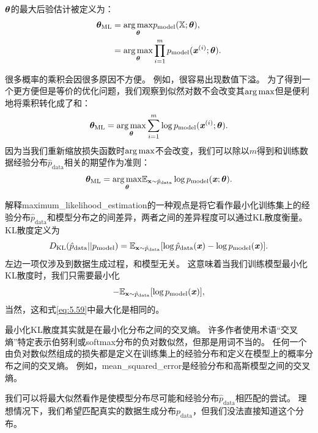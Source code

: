  $\boldsymbol{\theta}$的最大后验估计被定义为：
\begin{align}
    \boldsymbol{\theta}_{\text{ML}} &= \underset{\boldsymbol{\theta}}{\arg\max} p_{\text{model}} (\mathbb{X}; \boldsymbol{\theta}), \\
        &= \underset{\boldsymbol{\theta}}{\arg\max} \prod_{i=1}^m p_{\text{model}} (\boldsymbol{\mathit{x}}^{(i)}; \boldsymbol{\theta}).
\end{align}

很多概率的乘积会因很多原因不方便。
例如，很容易出现数值下溢。
为了得到一个更方便但是等价的优化问题，我们观察到似然对数不会改变其$\arg\max$但是便利地将乘积转化成了和：
\begin{equation}
    \boldsymbol{\theta}_{\text{ML}} = \underset{\boldsymbol{\theta}}{\arg\max} \sum_{i=1}^m \log p_{\text{model}} (\boldsymbol{\mathit{x}}^{(i)}; \boldsymbol{\theta}) .
\end{equation}
因为当我们重新缩放损失函数时$\arg\max$不会改变，我们可以除以$m$得到和训练数据经验分布$\hat{p}_{\text{data}}$相关的期望作为准则：
\begin{equation}
\label{eq:5.59}
    \boldsymbol{\theta}_{\text{ML}} = \underset{\boldsymbol{\theta}}{\arg\max} \mathbb{E}_{\mathbf{x} \sim \hat{p}_{\text{data}}} \log p_{\text{model}} (\boldsymbol{\mathit{x}}; \boldsymbol{\theta}) .
\end{equation}

解释\gls{maximum_likelihood_estimation}的一种观点是将它看作最小化训练集上的经验分布$\hat{p}_{\text{data}}$和模型分布之的间差异，两者之间的差异程度可以通过KL散度衡量。
KL散度定义为
\begin{equation}
    D_{\text{KL}}(\hat{p}_{\text{data}} || p_{\text{model}}) = \mathbb{E}_{\mathbf{x} \sim \hat{p}_{\text{data}}} [ \log \hat{p}_{\text{data}}(\boldsymbol{\mathit{x}}) - \log p_{\text{model}}(\boldsymbol{\mathit{x}}) ] .
\end{equation}
左边一项仅涉及到数据生成过程，和模型无关。
这意味着当我们训练模型最小化KL散度时，我们只需要最小化
\begin{equation}
    -\mathbb{E}_{\mathbf{x} \sim \hat{p}_{\text{data}}} [ \log p_{\text{model}}(\boldsymbol{\mathit{x}})  ] ,
\end{equation}
当然，这和式\ref{eq:5.59}中最大化是相同的。


最小化KL散度其实就是在最小化分布之间的交叉熵。
许多作者使用术语``交叉熵''特定表示伯努利或softmax分布的负对数似然，但那是用词不当的。
任何一个由负对数似然组成的损失都是定义在训练集上的经验分布和定义在模型上的概率分布之间的交叉熵。
例如，\gls{mean_squared_error}是经验分布和高斯模型之间的交叉熵。

我们可以将最大似然看作是使模型分布尽可能和经验分布$\hat{p}_{\text{data}}$相匹配的尝试。
理想情况下，我们希望匹配真实的数据生成分布$p_{\text{data}}$，但我们没法直接知道这个分布。

